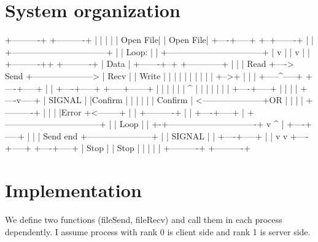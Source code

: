 \documentclass{article}
\begin{document}
\section{System organization}
         +----------+                                       +----------+
         |          |                                       |          |
         | Open File|                                       | Open File|
         +----+-----+                                       +--+-------+
              |                                                |
+---------------------------------+                            |
| Loop:       |                   |                  +---------------------------------+
|             v                   |                  |         v                       |
|  +----------++    +----------+  |     Data         | +-------+--+   +------------+   |
|  | Read      +----> Send     +---------------------> | Recv     |   |  Write     |   |
|  |           |    |          |  |                  | |          +-->+            |   |
|  +-----^-----+    +----+-----+  |                  | +----+-----+   +-----+------+   |
|        |               |        |                  |      ^               |          |
|        |               |        |                  | +----+-----+         |          |
|        |          +----v-----+  |    SIGNAL        | |Confirm   |         |          |
|        |          | Confirm  | <---------------------+OR        |         |          |
|        +----------+          |  |                  | |Error     +<--------+          |
|                   +----------+  |                  | +----+-----+                    |
+---------------------------------+                  |      |                 Loop     |
                         |                           +-+-------------------------------+
                         v                             ^    |
                    +----+-----+                       |    |
                    | Send end +-----------------------+    |
                    | SIGNAL   |                            |
                    +----+-----+                            |
                         |                                  v
                         v                             +----+-----+
                    +----+-----+                       | Stop     |
                    | Stop     |                       |          |
                    |          |                       +----------+
                    +----------+

\section{Implementation}
We define two functions (fileSend, fileRecv) and call them in each process dependently. I assume process with rank 0 is client side and rank 1 is server side. 
\end{document}
